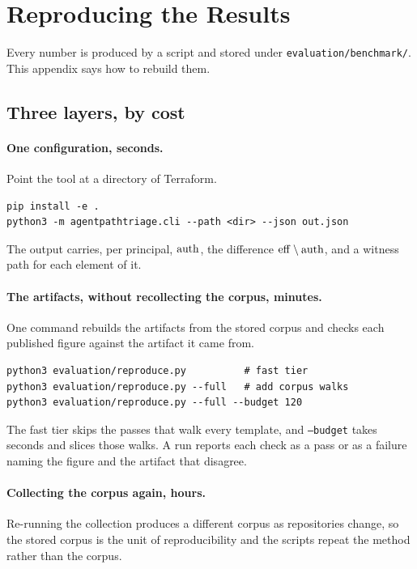 \section{Reproducing the Results}
\label{sec:repro}

Every number is produced by a script and stored under
\texttt{evaluation/benchmark/}. This appendix says how to rebuild them.

\subsection{Three layers, by cost}

\paragraph{One configuration, seconds.}
Point the tool at a directory of Terraform.

\begin{lstlisting}
pip install -e .
python3 -m agentpathtriage.cli --path <dir> --json out.json
\end{lstlisting}

The output carries, per principal, $\mathrm{auth}$, the difference
$\mathrm{eff} \setminus \mathrm{auth}$, and a witness path for each element of it.

\paragraph{The artifacts, without recollecting the corpus, minutes.}
One command rebuilds the artifacts from the stored corpus and checks each
published figure against the artifact it came from.

\begin{lstlisting}
python3 evaluation/reproduce.py          # fast tier
python3 evaluation/reproduce.py --full   # add corpus walks
python3 evaluation/reproduce.py --full --budget 120
\end{lstlisting}

The fast tier skips the passes that walk every template, and
\texttt{--budget} takes seconds and slices those walks. A run reports each
check as a pass or as a failure naming the figure and the artifact that
disagree.

\paragraph{Collecting the corpus again, hours.}
Re-running the collection produces a different corpus as repositories change,
so the stored corpus is the unit of reproducibility and the scripts repeat the
method rather than the corpus.

